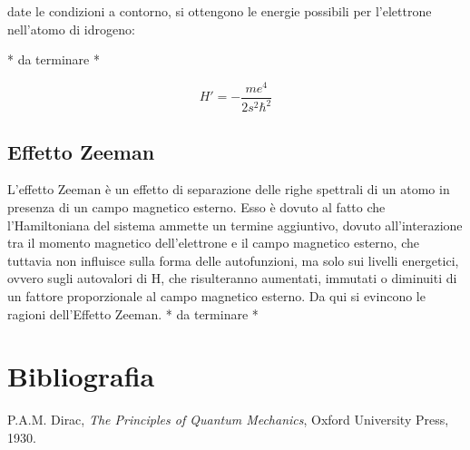 \documentclass{article}
\begin{document}
date le condizioni a contorno, si ottengono le energie possibili per l'elettrone nell'atomo di idrogeno:

* da terminare *

\begin{equation}
    H'=-\frac{me^4}{2s^2\hbar^2}
\end{equation}

\subsection{Effetto Zeeman}
L'effetto Zeeman è un effetto di separazione delle righe spettrali di un atomo in presenza di un campo magnetico esterno.
Esso è dovuto al fatto che l'Hamiltoniana del sistema ammette un termine aggiuntivo, dovuto all'interazione tra il momento magnetico dell'elettrone e il campo magnetico esterno,
che tuttavia non influisce sulla forma delle autofunzioni, ma solo sui livelli energetici, ovvero sugli autovalori di H,
che risulteranno aumentati, immutati o diminuiti di un fattore proporzionale al campo magnetico esterno.
Da qui si evincono le ragioni dell'Effetto Zeeman.
* da terminare *

\section{Bibliografia}
\begin{thebibliography}{9}
     P.A.M. Dirac, \emph{The Principles of Quantum Mechanics}, Oxford University Press, 1930.
\end{thebibliography}
\end{document}
